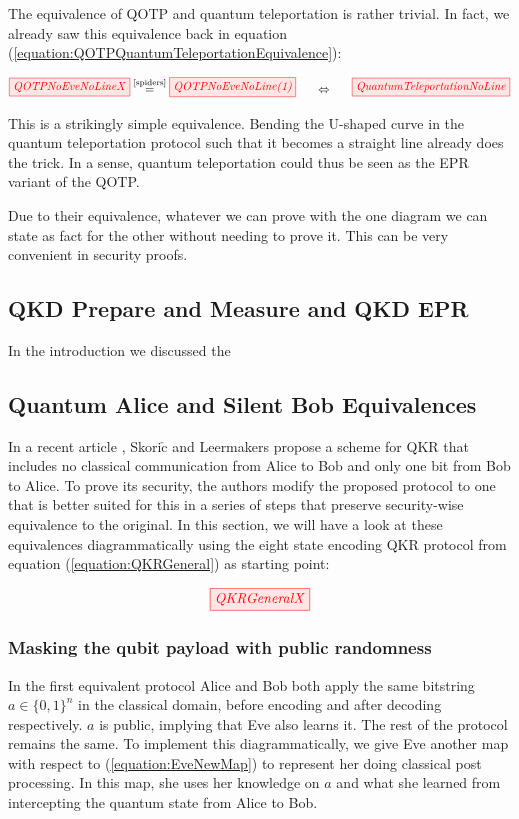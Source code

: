 \documentclass[]{article}
\newcommand{\equaltext}[1]{\ensuremath{\stackrel{\text{#1}}{=}}}
\begin{document}
The equivalence of QOTP and quantum teleportation is rather trivial. In fact, we already saw this equivalence back in equation (\ref{equation:QOTPQuantumTeleportationEquivalence}):

\begin{equation}
\tikzfig{QOTPNoEveNoLineX} \equaltext{\ref{spiders}} \tikzfig{QOTPNoEveNoLine(1)}~~~~~ \Leftrightarrow ~~~~~\tikzfig{QuantumTeleportationNoLine}
\end{equation}

This is a strikingly simple equivalence. Bending the U-shaped curve in the quantum teleportation protocol such that it becomes a straight line already does the trick. In a sense, quantum teleportation could thus be seen as the EPR variant of the QOTP. 

Due to their equivalence, whatever we can prove with the one diagram we can state as fact for the other without needing to prove it. This can be very convenient in security proofs.

\subsection{QKD Prepare and Measure and QKD EPR}

In the introduction we discussed the

\subsection{Quantum Alice and Silent Bob Equivalences}

\label{section:QAaSBEequivalences}
In a recent article \cite{Leermakers2019}, Skori$\check{\textrm{c}}$ and Leermakers propose a scheme for QKR that includes no classical communication from Alice to Bob and only one bit from Bob to Alice. To prove its security, the authors modify the proposed protocol to one that is better suited for this in a series of steps that preserve security-wise equivalence to the original. In this section, we will have a look at these equivalences diagrammatically using the eight state encoding QKR protocol from equation (\ref{equation:QKRGeneral}) as starting point:

\begin{equation}
\label{equation:QKRGeneral}
	\tikzfig{QKRGeneralX}
\end{equation}


\subsubsection{Masking the qubit payload with public randomness}
\label{section:maskingqubitpubrand}
In the first equivalent protocol Alice and Bob both apply the same bitstring $a \in \{0,1\}^n$ in the classical domain, before encoding and after decoding respectively. $a$ is public, implying that Eve also learns it. The rest of the protocol remains the same. To implement this diagrammatically, we give Eve another map with respect to (\ref{equation:EveNewMap}) to represent her doing classical post processing. In this map, she uses her knowledge on $a$ and what she learned from intercepting the quantum state from Alice to Bob.
\end{document}
